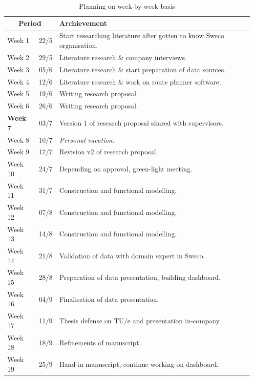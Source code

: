 \documentclass[sigconf, natbib=false, nonacm]{acmart}
\begin{document}
    \begin{table}
        \centering
        \begin{tabular}{ p{1.1cm} p{0.8cm} p{5.5cm} }
            \multicolumn{2}{c}{Period} & Archievement \\
            \hline
            Week 1  & 22/5 & Start researching literature after gotten to know Sweco organisation. \\
            Week 2  & 29/5 & Literature research \& company interviews. \\
            Week 3  & 05/6 & Literature research \& start preparation of data sources. \\
            Week 4  & 12/6 & Literature research \& work on route planner software. \\
            Week 5  & 19/6 & Writing research proposal. \\
            Week 6  & 26/6 & Writing research proposal. \\
            \textbf{Week 7}  & 03/7 & Version 1 of research proposal shared with supervisors. \\
            Week 8  & 10/7 & \textit{Personal vacation}. \\
            Week 9  & 17/7 & Revision v2 of research proposal. \\
            Week 10 & 24/7 & Depending on approval, green-light meeting. \\
            Week 11 & 31/7 & Construction and functional modelling. \\
            Week 12 & 07/8 & Construction and functional modelling. \\
            Week 13 & 14/8 & Construction and functional modelling. \\
            Week 14 & 21/8 & Validation of data with domain expert in Sweco. \\
            Week 15 & 28/8 & Preparation of data presentation, building dashboard. \\
            Week 16 & 04/9 & Finalisation of data presentation. \\
            Week 17 & 11/9 & Thesis defense on TU/e and presentation in-company \\
            Week 18 & 18/9 & Refinements of manuscript. \\
            Week 19 & 25/9 & Hand-in manuscript, continue working on dashboard. \\
        \end{tabular}
        \caption{Planning on week-by-week basis}
        \label{tab:planning}
    \end{table}
\end{document}
